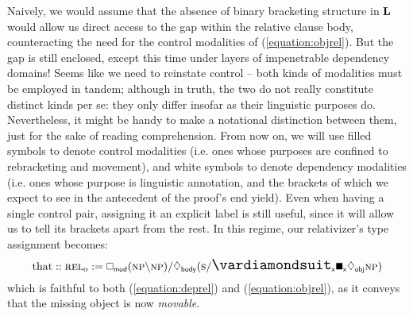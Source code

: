 Naively, we would assume that the absence of binary bracketing structure in $\textbf{L}$ would allow us direct access to the gap within the relative clause body, counteracting the need for the control modalities of (\ref{equation:objrel}).
But the gap is still enclosed, except this time under layers of impenetrable dependency domains!
Seems like we need to reinstate control -- both kinds of modalities must be employed in tandem;
although in truth, the two do not really constitute distinct kinds per se: they only differ insofar as their linguistic purposes do.
Nevertheless, it might be handy to make a notational distinction between them, just for the sake of reading comprehension.
From now on, we will use filled symbols to denote control modalities (i.e. ones whose purposes are confined to rebracketing and movement), and white symbols to denote dependency modalities (i.e. ones whose purpose is linguistic annotation, and the brackets of which we expect to see in the antecedent of the proof's end yield).
Even when having a single control pair, assigning it an explicit label  is still useful, since it will allow us to tell its brackets apart from the rest.
In this regime, our relativizer's type assignment becomes:
\begin{equation}
\text{that} :: \subcat{l}{rel}{o} := \dbox{mod}(\np\divleft\np)\divright\ddia{body}(\s\divright\dxdia{x}\dxbox{x}\ddia{obj}\np)
\end{equation}
which is faithful to both (\ref{equation:deprel}) and (\ref{equation:objrel}), as it conveys that the missing object is now \textit{movable}.


